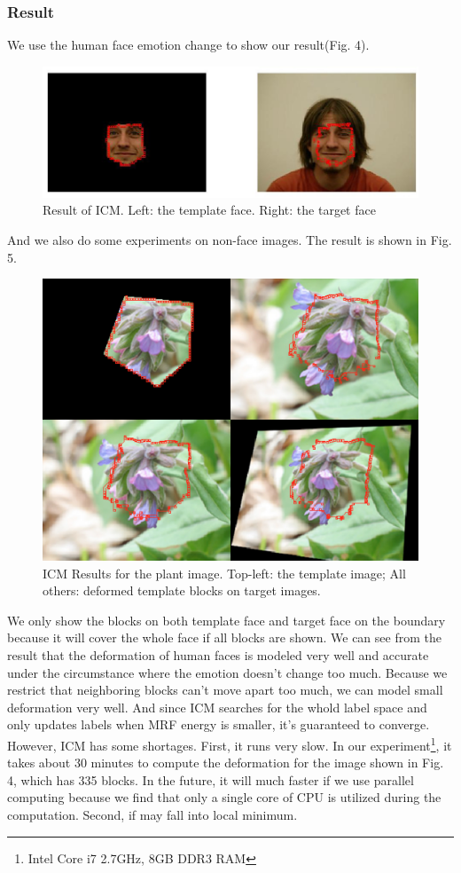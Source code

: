 \documentclass{article} %
\begin{document}
		\subsubsection{Result}
		We use the human face emotion change to show our result(Fig. 4).
		\begin{figure}[!ht]
		\centering
		\includegraphics[scale=0.4]{../Result/new-face3.jpg}
		\caption{Result of ICM. Left: the template face. Right: the target face}
		\end{figure}
		And we also do some experiments on non-face images. The result is shown in Fig. 5.
		\begin{figure}[!ht]
        \centering
        \includegraphics[scale=0.2]{showPlant.jpg}
        \caption{ICM Results for the plant image. Top-left: the template image; All others: deformed template blocks on target images.}
        \end{figure}
		We only show the blocks on both template face and target face on the boundary because it will cover the whole face if all blocks are shown. We can see from the result that the deformation of human faces is modeled very well and accurate under the circumstance where the emotion doesn't change too much. Because we restrict that neighboring blocks can't move apart too much, we can model small deformation very well. And since ICM searches for the whold label space and only updates labels when MRF energy is smaller, it's guaranteed to converge.\\
		However, ICM has some shortages. First, it runs very slow. In our experiment\footnote{Intel Core i7 2.7GHz, 8GB DDR3 RAM}, it takes about 30 minutes to compute the deformation for the image shown in Fig. 4, which has 335 blocks. In the future, it will much faster if we use parallel computing because we find that only a single core of CPU is utilized during the computation. Second, if may fall into local minimum.
\end{document}
